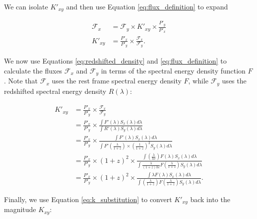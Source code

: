 \noindent We can isolate $K'_{xy}$ and then use Equation \ref{eq:flux_definition} to expand

\begin{equation}
\begin{aligned}
  \mathcal{F}_x &= \mathcal{F}_y \times K'_{xy} \times \frac{P'_y}{P'_x} \\
        K'_{xy} &= \frac{P'_x}{P'_y} \times \frac{\mathcal{F}_x}{\mathcal{F}_y} .
\end{aligned}
\end{equation}

\noindent We now use Equations \ref{eq:redshifted_density} and \ref{eq:flux_definition}
to calculate the fluxes $\mathcal{F}_x$ and $\mathcal{F}_y$ in terms of the
spectral energy density function $F$. Note that $\mathcal{F}_x$ uses the rest
frame spectral energy density $F$, while $\mathcal{F}_y$ uses the redshifted
spectral energy density $R(\lambda)$:

\begin{equation}
\begin{aligned}
  K'_{xy} &= \frac{P'_x}{P'_y} \times \frac{\mathcal{F}_x}{\mathcal{F}_y} \\
          &= \frac{P'_x}{P'_y} \times
              \frac{\int F'(\lambda) S_x(\lambda) d\lambda}
                   {\int R'(\lambda) S_y(\lambda) d\lambda} \\
          &= \frac{P'_x}{P'_y} \times
              \frac{\int F'(\lambda) S_x(\lambda) d\lambda}
                   {\int F'\left(\frac{\lambda}{1+z}\right) \times \left(\frac{1}{1 + z}\right)^2 S_y(\lambda) d\lambda} \\
          &= \frac{P'_x}{P'_y} \times (1+z)^2 \times
              \frac{\int \left(\frac{\lambda}{hc}\right) F(\lambda) S_x(\lambda) d\lambda}
                   {\int \frac{\lambda}{(1+z)hc} F\left(\frac{\lambda}{1+z}\right) S_y(\lambda) d\lambda} \\
          &= \frac{P'_x}{P'_y} \times (1 + z)^2 \times
              \frac{\int \lambda F(\lambda) S_x(\lambda) d\lambda}
                   {\int \left(\frac{\lambda}{1+z}\right) F\left(\frac{\lambda}{1+z}\right) S_y(\lambda) d\lambda} .
\end{aligned}
\end{equation}

Finally, we use Equation \ref{eq:k_substitution} to convert $K'_{xy}$ back into
the magnitude $K_{xy}$:

